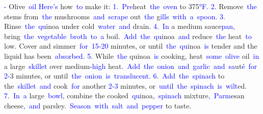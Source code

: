 \documentclass{article}
\begin{document}
\begin{tcolorbox}[colframe=black,colback=white]
\textcolor{blue}{-} Olive\textcolor{blue}{~oil}\textcolor{blue}{
}\textcolor{blue}{Here}\textcolor{blue}{'s} how\textcolor{blue}{~to} make it\textcolor{blue}{:
}\textcolor{blue}{1}\textcolor{blue}{.}\textcolor{blue}{~Pre}heat\textcolor{blue}{~the}\textcolor{blue}{~oven} to 375\textcolor{blue}{°F}\textcolor{blue}{.
}\textcolor{blue}{2}. Remove\textcolor{blue}{~the} stems from\textcolor{blue}{~the} mushrooms\textcolor{blue}{~and}\textcolor{blue}{~scrape} out\textcolor{blue}{~the} g\textcolor{blue}{ills}\textcolor{blue}{~with}\textcolor{blue}{~a}\textcolor{blue}{~spoon}\textcolor{blue}{.
}\textcolor{blue}{3}. Rinse\textcolor{blue}{~the}\textcolor{blue}{~qu}inoa under cold\textcolor{blue}{~water}\textcolor{blue}{~and} drain\textcolor{blue}{.
}\textcolor{blue}{4}.\textcolor{blue}{~In} a medium sauce\textcolor{blue}{pan}\textcolor{blue}{,} bring\textcolor{blue}{~the}\textcolor{blue}{~vegetable}\textcolor{blue}{~broth}\textcolor{blue}{~to}\textcolor{blue}{~a} boil.\textcolor{blue}{~Add}\textcolor{blue}{~the}\textcolor{blue}{~qu}inoa\textcolor{blue}{~and} reduce\textcolor{blue}{~the} heat\textcolor{blue}{~to} low\textcolor{blue}{.} Cover and simmer\textcolor{blue}{~for}\textcolor{blue}{~}\textcolor{blue}{15}\textcolor{blue}{-}\textcolor{blue}{20} minutes, or until\textcolor{blue}{~the}\textcolor{blue}{~qu}inoa\textcolor{blue}{~is} tender and the liquid has been\textcolor{blue}{~absorbed}\textcolor{blue}{.
}\textcolor{blue}{5}. While\textcolor{blue}{~the} quinoa\textcolor{blue}{~is} cooking\textcolor{blue}{,} heat\textcolor{blue}{~some}\textcolor{blue}{~olive} oil\textcolor{blue}{~in} a large\textcolor{blue}{~skillet} over medium\textcolor{blue}{-high} heat\textcolor{blue}{.}\textcolor{blue}{~Add}\textcolor{blue}{~the}\textcolor{blue}{~onion}\textcolor{blue}{~and}\textcolor{blue}{~garlic}\textcolor{blue}{~and}\textcolor{blue}{~sa}ut\textcolor{blue}{é}\textcolor{blue}{~for} \textcolor{blue}{2}\textcolor{blue}{-}3 minutes, or until\textcolor{blue}{~the}\textcolor{blue}{~onion}\textcolor{blue}{~is}\textcolor{blue}{~translucent}\textcolor{blue}{.
}\textcolor{blue}{6}.\textcolor{blue}{~Add}\textcolor{blue}{~the}\textcolor{blue}{~spinach} to the\textcolor{blue}{~skillet}\textcolor{blue}{~and} cook\textcolor{blue}{~for} another \textcolor{blue}{2}\textcolor{blue}{-}\textcolor{blue}{3} minutes, or\textcolor{blue}{~until}\textcolor{blue}{~the}\textcolor{blue}{~spinach}\textcolor{blue}{~is}\textcolor{blue}{~wilt}ed\textcolor{blue}{.
}\textcolor{blue}{7}.\textcolor{blue}{~In}\textcolor{blue}{~a} large\textcolor{blue}{~bowl}, combine the cooked\textcolor{blue}{~qu}inoa\textcolor{blue}{,}\textcolor{blue}{~spinach} mixture\textcolor{blue}{,}\textcolor{blue}{~Parm}esan cheese\textcolor{blue}{,}\textcolor{blue}{~and} parsley.\textcolor{blue}{~Season}\textcolor{blue}{~with}\textcolor{blue}{~salt}\textcolor{blue}{~and}\textcolor{blue}{~pepper} to taste\textcolor{blue}{.
}
\end{tcolorbox}
\end{document}
